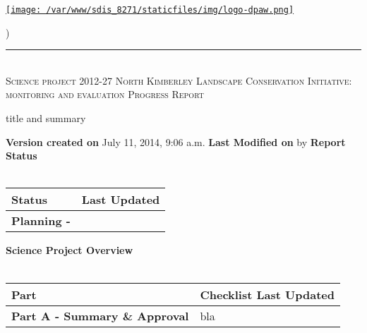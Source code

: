 \documentclass[version=last, paper=a4, DIV=18, usenames, dvipsnames]{scrartcl}
\newcommand{\HRule}{\rule{\linewidth}{0.1pt}}
\begin{document}
\setcounter{secnumdepth}{-1}


\begin{titlepage}
\begin{center}
\begin{minipage}[t]{0.28\textwidth}
\begin{flushleft}
\href{http://www.dpaw.wa.gov.au}{\texttt{[image: /var/www/sdis\_8271/staticfiles/img/logo-dpaw.png]}}
\end{flushleft}
\end{minipage}
\begin{minipage}[b]{0.7\textwidth}
\begin{flushright}
    \href{http://sdis.dpaw.wa.gov.au/documents/progressreport/1151/download/tex/}{}) \\
\end{flushright}
\end{minipage}
\HRule \\[0.4cm]
\vfill
\textsc{\Huge Science project 2012-27 North Kimberley Landscape Conservation Initiative: monitoring and evaluation \newline }
\vfill
\textsc{\Huge Progress Report}

\vfill\vfill\vfill\vfill
title and summary

\vfill\vfill\vfill\vfill\vfill\vfill\vfill\vfill

\textbf{Version created on} July 11, 2014, 9:06 a.m.
\vfill
\textbf{Last Modified on}  by 
\vfill\vfill
\textbf{Report Status}\\\,
\begin{tabu} to \linewidth { | X[l] | X | }
\hline
{}
Status & Last Updated \\
\hline
\textbf{Planning - } \\
\hline
\end{tabu}
\vfill
\textbf{Science Project Overview}\\\,
\begin{tabu} to \linewidth { | X[l] | X | }
\hline
{}
Part & Checklist Last Updated \\
\hline
\textbf{Part A - Summary \& Approval} & bla \\
\hline
\end{tabu}

\end{center}
\end{titlepage}

\setcounter{tocdepth}{2}
\tableofcontents
\clearpage
\end{document}
